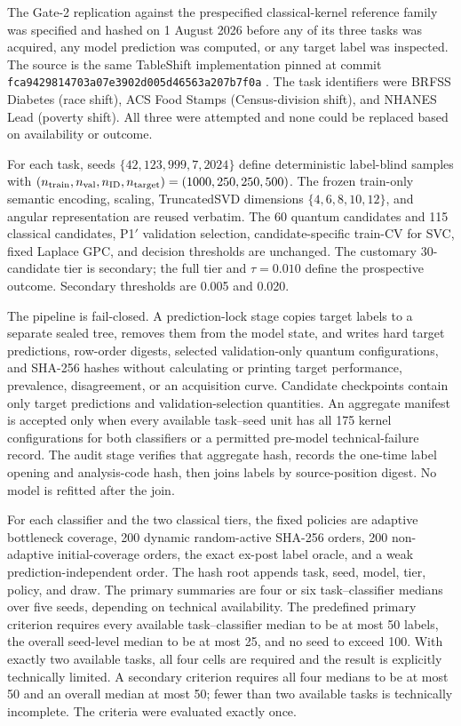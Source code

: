 \documentclass[referee,lineno,pdflatex,sn-vancouver-num]{sn-jnl}
\theoremstyle{thmstyleone}%
\theoremstyle{thmstyletwo}%
\theoremstyle{thmstylethree}%
\begin{document}
The Gate-2 replication against the prespecified classical-kernel reference family was specified and hashed on 1 August 2026 before any of its three tasks was acquired, any model prediction was computed, or any target label was inspected. The source is the same TableShift implementation pinned at commit \texttt{fca9429814703a07e3902d005d46563a207b7f0a} \cite{gardner2023tableshift}. The task identifiers were BRFSS Diabetes (race shift), ACS Food Stamps (Census-division shift), and NHANES Lead (poverty shift). All three were attempted and none could be replaced based on availability or outcome.

For each task, seeds $\{42,123,999,7,2024\}$ define deterministic label-blind samples with $(n_{\rm train},n_{\rm val},n_{\rm ID},n_{\rm target})=(1000,250,250,500)$. The frozen train-only semantic encoding, scaling, TruncatedSVD dimensions $\{4,6,8,10,12\}$, and angular representation are reused verbatim. The 60 quantum candidates and 115 classical candidates, P1$'$ validation selection, candidate-specific train-CV for SVC, fixed Laplace GPC, and decision thresholds are unchanged. The customary 30-candidate tier is secondary; the full tier and $\tau=0.010$ define the prospective outcome. Secondary thresholds are 0.005 and 0.020.

The pipeline is fail-closed. A prediction-lock stage copies target labels to a separate sealed tree, removes them from the model state, and writes hard target predictions, row-order digests, selected validation-only quantum configurations, and SHA-256 hashes without calculating or printing target performance, prevalence, disagreement, or an acquisition curve. Candidate checkpoints contain only target predictions and validation-selection quantities. An aggregate manifest is accepted only when every available task--seed unit has all 175 kernel configurations for both classifiers or a permitted pre-model technical-failure record. The audit stage verifies that aggregate hash, records the one-time label opening and analysis-code hash, then joins labels by source-position digest. No model is refitted after the join.

For each classifier and the two classical tiers, the fixed policies are adaptive bottleneck coverage, 200 dynamic random-active SHA-256 orders, 200 non-adaptive initial-coverage orders, the exact ex-post label oracle, and a weak prediction-independent order. The hash root appends task, seed, model, tier, policy, and draw. The primary summaries are four or six task--classifier medians over five seeds, depending on technical availability. The predefined primary criterion requires every available task--classifier median to be at most 50 labels, the overall seed-level median to be at most 25, and no seed to exceed 100. With exactly two available tasks, all four cells are required and the result is explicitly technically limited. A secondary criterion requires all four medians to be at most 50 and an overall median at most 50; fewer than two available tasks is technically incomplete. The criteria were evaluated exactly once.
\end{document}

